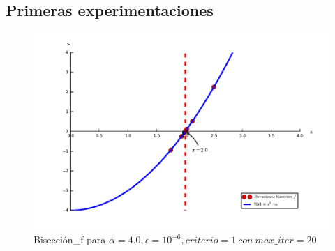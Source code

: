 
\subsection{Primeras experimentaciones}

\begin{figure}[!h]
	\begin{center}
		  \includegraphics[keepaspectratio]{../Imagenes/exp1/biseccion_f.pdf}
		  \caption{Bisección\_f para $\alpha=4.0, \epsilon = 10^{-6}, criterio = 1\  con \ max\_iter=20$}
		  \label{fig:contra1}
	\end{center}
\end{figure}
\FloatBarrier
~

